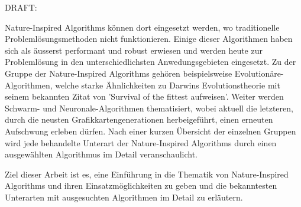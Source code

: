 % 
% 
%
DRAFT:

Nature-Inspired Algorithms können dort eingesetzt werden, wo traditionelle
Problemlösungsmethoden nicht funktionieren. Einige dieser Algorithmen haben
sich als äusserst performant und robust erwiesen und werden heute zur Problemlösung
in den unterschiedlichsten Anwedungsgebieten eingesetzt. Zu der Gruppe der Nature-Inspired
Algorithms gehören beispielsweise Evolutionäre-Algorithmen, welche starke Ähnlichkeiten zu
Darwins Evolutionstheorie mit seinem bekannten Zitat von 'Survival of the fittest aufweisen'.
Weiter werden Schwarm- und Neuronale-Algorithmen thematisiert, wobei aktuell die letzteren,
durch die neusten Grafikkartengenerationen herbeigeführt, einen erneuten Aufschwung erleben
dürfen. Nach einer kurzen Übersicht der einzelnen Gruppen wird jede behandelte Unterart der
Nature-Inspired Algorithms durch einen ausgewählten Algorithmus im Detail veranschaulicht.

Ziel dieser Arbeit ist es, eine Einführung in die Thematik von Nature-Inspired Algorithms und ihren
Einsatzmöglichkeiten zu geben und die bekanntesten Unterarten mit ausgesuchten Algorithmen im Detail
zu erläutern.

